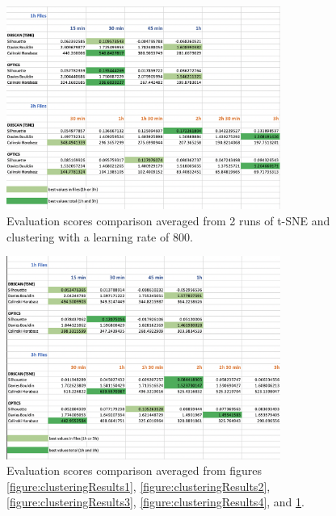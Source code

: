 \begin{figure}
  \centering
  \includegraphics[width=0.8\textwidth]{./images/clusteringResults/clusteringResults5.png}
  \caption{Evaluation scores comparison averaged from 2 runs of t-SNE and clustering with a learning rate of 800.}
  \label{figure:clusteringResults5}
\end{figure}

\begin{figure}
  \centering
  \includegraphics[width=0.8\textwidth]{./images/clusteringResults/clusteringResults6.png}
  \caption{Evaluation scores comparison averaged from figures \ref{figure:clusteringResults1}, \ref{figure:clusteringResults2}, \ref{figure:clusteringResults3}, \ref{figure:clusteringResults4}, and \ref{figure:clusteringResults5}.}
  \label{figure:clusteringResults6}
\end{figure}





